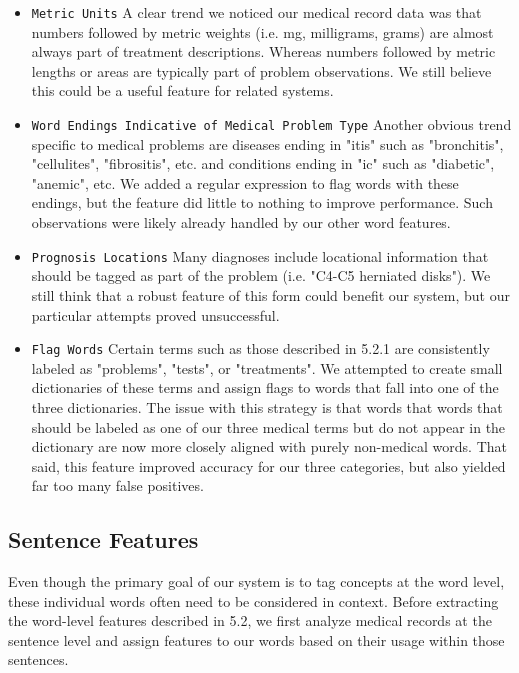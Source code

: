 \documentclass[preprint]{style}
\begin{document}
\begin{itemize}

\item {\tt Metric Units}
A clear trend we noticed our medical record data was that numbers followed by metric weights (i.e. mg, milligrams, grams) are almost always part of treatment descriptions. Whereas numbers followed by metric lengths or areas are typically part of problem observations. We still believe this could be a useful feature for related systems.
 
\item {\tt Word Endings Indicative of Medical Problem Type}
Another obvious trend specific to medical problems are diseases ending in "itis" such as "bronchitis", "cellulites", "fibrositis", etc. and conditions ending in "ic" such as "diabetic", "anemic", etc. We added a regular expression to flag words with these endings, but the feature did little to nothing to improve performance. Such observations were likely already handled by our other word features.

\item {\tt Prognosis Locations}
Many diagnoses include locational information that should be tagged as part of the problem (i.e. "C4-C5 herniated disks"). We still think that a robust feature of this form could benefit our system, but our particular attempts proved unsuccessful.  

\item {\tt Flag Words}
Certain terms such as those described in 5.2.1 are consistently labeled as "problems", "tests", or "treatments". We attempted to create small dictionaries of these terms and assign flags to words that fall into one of the three dictionaries. The issue with this strategy is that words that words that should be labeled as one of our three medical terms but do not appear in the dictionary are now more closely aligned with purely non-medical words. That said, this feature improved accuracy for our three categories, but also yielded far too many false positives.

\end{itemize}

\subsection{Sentence Features}
Even though the primary goal of our system is to tag concepts at the word level, these individual words often need to be considered in context. Before extracting the word-level features described in 5.2, we first analyze medical records at the sentence level and assign features to our words based on their usage within those sentences.
\end{document}
